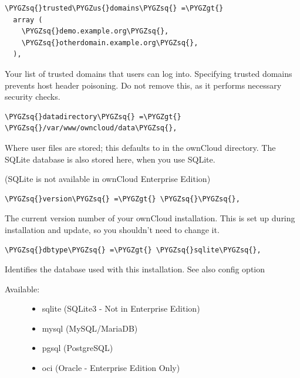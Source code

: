 \documentclass[letterpaper,10pt,english]{sphinxmanual}
\def\PYGZus{\char`\_}
\def\PYGZgt{\char`\>}
\def\PYGZsq{\char`\'}
\renewcommand\PYGZsq{\textquotesingle}
\begin{document}
\begin{Verbatim}[commandchars=\\\{\}]
\PYGZsq{}trusted\PYGZus{}domains\PYGZsq{} =\PYGZgt{}
  array (
    \PYGZsq{}demo.example.org\PYGZsq{},
    \PYGZsq{}otherdomain.example.org\PYGZsq{},
  ),
\end{Verbatim}

Your list of trusted domains that users can log into. Specifying trusted
domains prevents host header poisoning. Do not remove this, as it performs
necessary security checks.

\begin{Verbatim}[commandchars=\\\{\}]
\PYGZsq{}datadirectory\PYGZsq{} =\PYGZgt{} \PYGZsq{}/var/www/owncloud/data\PYGZsq{},
\end{Verbatim}

Where user files are stored; this defaults to  in the ownCloud
directory. The SQLite database is also stored here, when you use SQLite.

(SQLite is not available in ownCloud Enterprise Edition)

\begin{Verbatim}[commandchars=\\\{\}]
\PYGZsq{}version\PYGZsq{} =\PYGZgt{} \PYGZsq{}\PYGZsq{},
\end{Verbatim}

The current version number of your ownCloud installation. This is set up
during installation and update, so you shouldn't need to change it.

\begin{Verbatim}[commandchars=\\\{\}]
\PYGZsq{}dbtype\PYGZsq{} =\PYGZgt{} \PYGZsq{}sqlite\PYGZsq{},
\end{Verbatim}

Identifies the database used with this installation. See also config option
\begin{description}
\item[{Available:}] \leavevmode\begin{itemize}
\item {} 
sqlite (SQLite3 - Not in Enterprise Edition)

\item {} 
mysql (MySQL/MariaDB)

\item {} 
pgsql (PostgreSQL)

\item {} 
oci (Oracle - Enterprise Edition Only)

\end{itemize}

\end{description}
\end{document}
